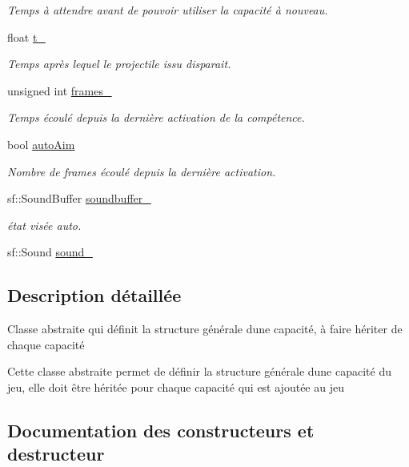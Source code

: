 \begin{DoxyCompactItemize}
\begin{DoxyCompactList}\small\item\em Temps à attendre avant de pouvoir utiliser la capacité à nouveau. \end{DoxyCompactList}\item 
float \hyperlink{class_capacite_ade805898750e70261be4f4ced92a9063}{t\+\_\+}
\begin{DoxyCompactList}\small\item\em Temps après lequel le projectile issu disparait. \end{DoxyCompactList}\item 
unsigned int \hyperlink{class_capacite_a250c28dafd8e12b58ccfb4224329f111}{frames\+\_\+}
\begin{DoxyCompactList}\small\item\em Temps écoulé depuis la dernière activation de la compétence. \end{DoxyCompactList}\item 
bool \hyperlink{class_capacite_a16c9104da3291eb0cae4238fed736e58}{auto\+Aim}
\begin{DoxyCompactList}\small\item\em Nombre de frames écoulé depuis la dernière activation. \end{DoxyCompactList}\item 
sf\+::\+Sound\+Buffer \hyperlink{class_capacite_abb9d4886a4cd56b9e95d53f527fcaec6}{soundbuffer\+\_\+}
\begin{DoxyCompactList}\small\item\em état visée auto. \end{DoxyCompactList}\item 
sf\+::\+Sound \hyperlink{class_capacite_a535908d8d284fcf9df844fe6f6c3c6b3}{sound\+\_\+}
\end{DoxyCompactItemize}


\subsection{Description détaillée}
Classe abstraite qui définit la structure générale d\textquotesingle{}une capacité, à faire hériter de chaque capacité 

Cette classe abstraite permet de définir la structure générale d\textquotesingle{}une capacité du jeu, elle doit être héritée pour chaque capacité qui est ajoutée au jeu 

\subsection{Documentation des constructeurs et destructeur}
\mbox{\label{class_capacite_a8a1aebc5b2332e366a3f207c23b4d363}} 
